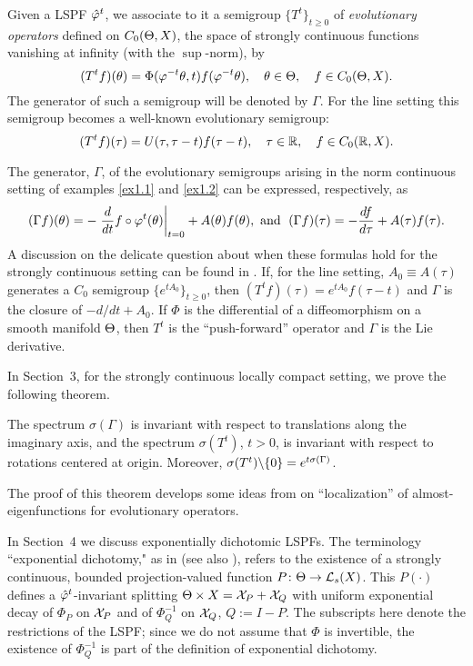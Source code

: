 Given a LSPF ${\hat{\varphi}}^t$, we associate to it a semigroup
$\{T^t\}_{t\ge0}$ of {\it evolutionary operators} defined
on $C_0(\Theta,X)$, the space of strongly continuous functions vanishing
at infinity (with the $\sup$-norm), by
\[(T^tf)(\theta )=\Phi(\varphi^{-t}\theta ,t)f(\varphi^{-t}\theta ),\quad \theta\in \Theta,
\quad f\in C_0(\Theta,X).\]  The generator of such a semigroup will
be denoted by $\Gamma$.
For the line setting this semigroup becomes a well-known
\cite{Evans,Gold,Howland,Lum,Nag2,Nei,Rau1,Rau2} evolutionary
semigroup:
\[(T^tf)(\tau)=U(\tau,\tau-t)f(\tau-t), \quad
\tau\in{\Bbb{R}},\quad f\in C_0({\Bbb{R}},X).\]

The generator, $\Gamma$, of the evolutionary semigroups
arising in the norm continuous setting of examples
\ref{ex1.1} and \ref{ex1.2} can be expressed, respectively, as
$$(\Gamma f)(\theta )
=-\left.\dfrac{d}{dt}f\circ\varphi^t(\theta)\right|_{t=0}+A(\theta)f(\theta),
\text{  and  }\; (\Gamma f)(\tau)
=-\dfrac{df}{d\tau}+A(\tau)f(\tau).$$
A discussion on the delicate question about when these formulas hold
for the strongly continuous setting can be found in
\cite{Nag2,NagRh}. If, for the line setting, $A_0\equiv A(\tau)$
generates a $C_0$ semigroup $\{e^{tA_0}\}_{t\ge0}$, then
$(T^tf)(\tau)=e^{tA_0}f(\tau-t)$ and $\Gamma$ is the closure
of $-d/dt+A_0$. If $\Phi$ is the differential of a diffeomorphism on
a smooth manifold $\Theta$, then $T^t$ is the ``push-forward'' operator
and $\Gamma$ is the Lie derivative.

In Section~3, for the strongly continuous locally compact
setting, we prove the following theorem.

\begin{introSMT}
The spectrum $\sigma(\Gamma)$ is invariant with respect to
translations along the imaginary axis, and the spectrum
$\sigma(T^t)$, $t>0$, is invariant with respect to
rotations centered at origin. Moreover,
$\sigma(T^t)\backslash \{0\}= e^{t\sigma(\Gamma)}$.
\end{introSMT}

The proof of this theorem develops some ideas from
\cite{Mather} on ``localization'' of almost-eigenfunctions for
evolutionary operators.

In Section~4 we discuss exponentially dichotomic LSPFs.
The terminology ``exponential dichotomy," as in \cite{ChLe1} (see also
\cite{HL,Henry,Mag,SSBan}), refers to the existence of a strongly
continuous, bounded projection-valued function $P\colon \Theta\to
{\cal{L}}_s(X)$. This $P(\cdot)$ defines a
${\hat{\varphi}}^t$-invariant splitting
$\Theta\times X={\cal{X}}_P+{\cal{X}}_Q$ with uniform exponential decay of
$\Phi_P$ on ${\cal{X}}_P$ and of $\Phi_Q^{-1}$ on ${\cal{X}}_Q$, $Q:=I-P$.
The  subscripts here denote the restrictions of the LSPF; since we
do not assume that $\Phi$ is invertible, the existence of
$\Phi_Q^{-1}$ is part of the definition of exponential dichotomy.

